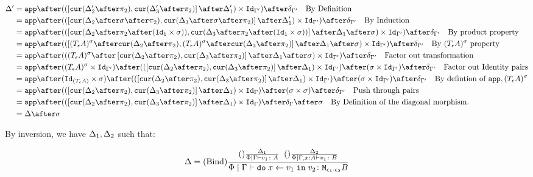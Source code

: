 \documentclass{report}
\begin{document}
\begin{align}
    \D' & =\app\after((\fld{\cur{\D_2'\after\pp}}{\cur{\D_3'\after\pp}}\after\D_1')\times \Id{\G'})\after\diag{\G'}\qt{By Definition}\\
    & =\app\after((\fld{\cur{\D_2\after\si\after\pp}}{\cur{\D_3\after\si\after\pp}}\after\D_1')\times \Id{\G'})\after\diag{\G'}\qt{By Induction}\\
    & = \app\after((\fld{\cur{\D_2\after\pp\after(\Id{\1}\times \si)}}{\cur{\D_3\after\pp\after(\Id{\1}\times \si)}}\after\D_1\after\si)\times \Id{\G'})\after\diag{\G'}\qt{By product property}\\
    & = \app\after((\fld{(\tea)^{\si}\after\cur{\D_2\after\pp}}{(\tea)^{\si}\after\cur{\D_3\after\pp}}\after\D_1\after\si)\times \Id{\G'})\after\diag{\G'}\qt{By $(\tea)^{\si}$ property}\\
    & = \app\after(((\tea)^{\si}\after\fld{\cur{\D_2\after\pp}}{\cur{\D_3\after\pp}}\after\D_1\after\si)\times \Id{\G'})\after\diag{\G'}\qt{Factor out transformation}\\
    & = \app\after((\tea)^{\si}\times\Id{\G'})\after((\fld{\cur{\D_2\after\pp}}{\cur{\D_3\after\pp}}\after\D_1)\times \Id{\G'})\after(\si \times \Id{\G'})\after\diag{\G'}\qt{Factor out Identity pairs}\\
    & = \app\after(\Id{(\tea)}\times\si)\after((\fld{\cur{\D_2\after\pp}}{\cur{\D_3\after\pp}}\after\D_1) \times \Id{\G'})\after(\si \times \Id{\G'})\after\diag{\G'}\qt{By defintion of $\app, (\tea)^{\si}$}\\
    & = \app\after((\fld{\cur{\D_2\after\pp}}{\cur{\D_3\after\pp}}\after\D_1)\times \idg)\after(\si \times \si)\after\diag{\G'}\qt{Push through pairs}\\
    & = \app\after((\fld{\cur{\D_2\after\pp}}{\cur{\D_3\after\pp}}\after\D_1)\times \idg)\after\diag{\G}\after\si\qt{By Definition of the diagonal morphism.}\\
    & = \D\after\si
\end{align}



By inversion, we have $\Delta_1, \Delta_2$ such that:

\begin{equation}
    \Delta = (\text{Bind}) \frac{
        (\text{}) \frac{\Delta_1}{\Phi\mid\Gamma \vdash v_1 \colon A}
        \;\;
        (\text{}) \frac{\Delta_2}{\Phi\mid\Gamma, x:A  \vdash v_1 \colon B}
    }{
        \Phi\mid\Gamma \vdash \texttt{do}\; x \leftarrow v_1 \;\texttt{in}\; v_2 \colon \texttt{M}_{\epsilon_1\cdot\epsilon_2}{B}
    }
\end{equation}
\end{document}
